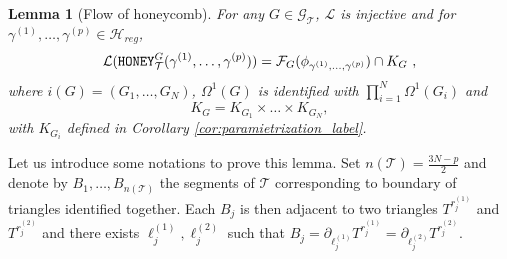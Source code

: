 \documentclass[11pt,a4paper]{amsart}
\providecommand{\honey}{\texttt{\textsc{HONEY}}}
\numberwithin{equation}{section}
\newtheorem{lemma}[theorem]{Lemma}
\theoremstyle{definition}
\begin{document}
\begin{lemma}[Flow of honeycomb]
    \label{lem:differential_gluing_honey}
    For any $G\in\mathcal{G}_{\mathcal{T}}$, $\mathcal{L}$ 
    is injective and for $\gamma^{(1)},\ldots,\gamma^{(p)} 
    \in\mathcal{H}_{reg}$, 
    $$\mathcal{L}(\honey_{\mathcal{T}}^G(\gamma^{(1)}, 
    \ldots,\gamma^{(p)})) = 
    \mathcal{F}_{G}(\phi_{\gamma^{(1)},\ldots,\gamma^{(p)}}) 
    \cap K_G \ ,$$
    where $i(G)=(G_1,\ldots,G_N)$, $\Omega^1(G)$ 
    is identified with $\prod_{i=1}^N\Omega^1(G_i)$ and 
    $$K_G=K_{G_1}\times \dots\times K_{G_N},$$
    with $K_{G_i}$ defined in Corollary \ref{cor:paramietrization_label}.
\end{lemma}

Let us introduce some notations to prove this lemma. Set $n(\mathcal{T})=\frac{3N-p}{2}$ and denote 
by $B_{1},\ldots,B_{n(\mathcal{T})}$ the segments of $\mathcal{T}$ 
corresponding to boundary of triangles identified together. 
Each $B_j$ is then adjacent to two triangles $T^{r^{(1)}_j}$ and $T^{r^{(2)}_j}$ 
and there exists $\ell^{(1)}_j,\ell^{(2)}_j$ such that 
$B_j=\partial_{\ell^{(1)}_j}T^{r^{(1)}_j}=\partial_{\ell^{(2)}_j}T^{r^{(2)}_j}$.
\noindent
\end{document}
